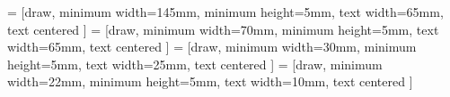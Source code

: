 \documentclass{minimal}
\begin{document}

     =   [draw, 
                                 minimum width=145mm,
                                 minimum height=5mm,
                                 text width=65mm,
                                 text centered
                                ]
      =   [draw, 
                                 minimum width=70mm,
                                 minimum height=5mm,
                                 text width=65mm,
                                 text centered
                                ]
        =   [draw,
                                 minimum width=30mm,
                                 minimum height=5mm,
                                 text width=25mm,
                                 text centered
                                ]
      =   [draw,
                                 minimum width=22mm,
                                 minimum height=5mm,
                                 text width=10mm,
                                 text centered
                                 ]
\def\distsmall{15mm}
\def\distmed{30mm}
\def\distlarge{75mm}
\def\vdistsmall{5mm}
\def\vdistlarge{70mm}
\end{document}
